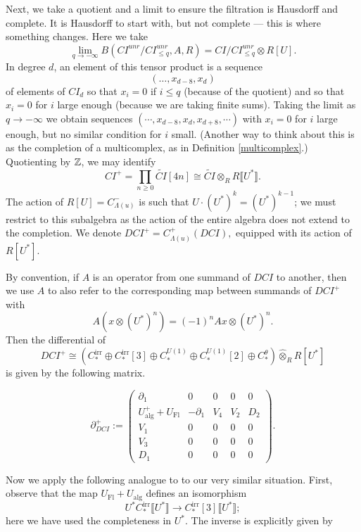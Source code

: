 \documentclass{memo-l}
\theoremstyle{definition}
\theoremstyle{remark}
\numberwithin{section}{chapter}
\numberwithin{equation}{chapter}
\begin{document}
Next, we take a quotient and a limit to ensure the filtration is Hausdorff and complete. It is Hausdorff to start with, but not complete --- this is where something changes. Here we take $$\lim_{q \to -\infty} B(CI^{unr}/CI^{unr}_{\le q}, A, R) = CI/CI^{unr}_{\le q} \otimes R[U].$$ In degree $d$, an element of this tensor product is a sequence $$(\dots, x_{d-8}, x_d)$$ of elements of $CI_d$ so that $x_i = 0$ if $i \le q$ (because of the quotient) and so that $x_i = 0$ for $i$ large enough (because we are taking finite sums). Taking the limit as $q \to -\infty$ we obtain sequences $(\cdots, x_{d-8}, x_d, x_{d+8}, \cdots)$ with $x_i = 0$ for $i$ large enough, but no similar condition for $i$ small. (Another way to think about this is as the completion of a multicomplex, as in Definition \ref{multicomplex}.) Quotienting by $\Bbb Z$, we may identify $$CI^+ = \prod_{n \geq 0} \widetilde{CI}[4n] \cong \widetilde{CI} \otimes_R R\llbracket U^*\rrbracket.$$ The action of $R[U] = C^-_{\Lambda(u)}$ is such that $U \cdot (U^*)^k = (U^*)^{k-1}$; we must restrict to this subalgebra as the action of the entire algebra does not extend to the completion. We denote $DCI^+ = C^+_{\Lambda(u)}(DCI),$ equipped with its action of $R[U^*]$.

By convention, if $A$ is an operator from one summand of $DCI$ to another, then we use $A$ to also refer to the corresponding map between summands of $DCI^+$ with 
$$A(x \otimes (U^*)^n) = (-1)^n Ax \otimes (U^*)^n.$$ 
Then the differential of $$DCI^+ \cong \left(C_*^\text{irr} \oplus C_*^\text{irr}[3] \oplus C_*^{U(1)} \oplus C_*^{U(1)}[2] \oplus C_*^\theta\right) \widehat{\otimes}_R R[U^*]$$ is given by the following matrix.
 
$$\partial_{DCI}^+ := \begin{pmatrix}\partial_1 & 0 & 0 & 0 & 0\\
U_{\text{alg}}^+ + U_{\text{Fl}} & -\partial_1 & V_4 & V_2 & D_2 \\ 
V_1 & 0 & 0 & 0 & 0\\ 
V_3 & 0 & 0 & 0 & 0\\ 
D_1 & 0 & 0 & 0 & 0\end{pmatrix}.$$

Now we apply the following analogue to \cite[Lemma~5]{SS-Invol} to our very similar situation. First, observe that the map $U_\text{Fl} + U_{\text{alg}}$ defines an isomorphism $$U^* C_*^{\text{irr}}\llbracket U^*\rrbracket \to C_*^{\text{irr}}[3] \llbracket U^*\rrbracket;$$ here we have used the completeness in $U^*$. The inverse is explicitly given by 
\end{document}

